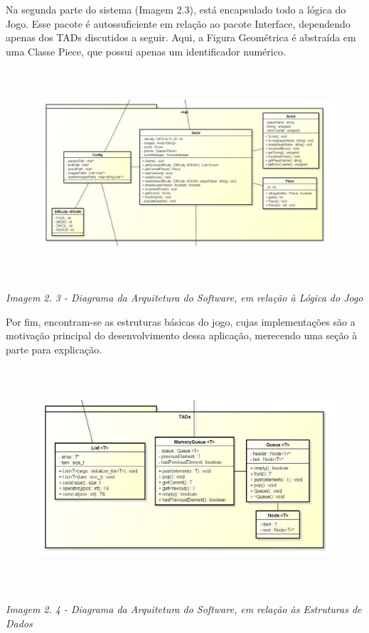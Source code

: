 \documentclass[a4paper]{article}
\newcounter{Imagem2}
\newcounter{Imagem1}
\begin{document}
\bigskip

Na segunda parte do sistema (Imagem 2.3), está encapsulado todo a lógica
do Jogo. Esse pacote é autossuficiente em relação ao pacote Interface,
dependendo apenas dos TADs discutidos a seguir. Aqui, a Figura
Geométrica é abstraída em uma Classe Piece, que possui apenas um
identificador numérico.

\begin{figure}
\centering
\includegraphics[width=6.2917in,height=3.0626in]{T1-img9.png}
\end{figure}

\bigskip

{\centering\itshape\color[rgb]{0.26666668,0.32941177,0.41568628}
Imagem 2. 3 - Diagrama da Arquitetura do Software, em relação à Lógica
do Jogo
\par}


\bigskip

Por fim, encontram-se as estruturas básicas do jogo, cujas
implementações são a motivação principal do desenvolvimento dessa
aplicação, merecendo uma seção à parte para explicação.



\begin{figure}
\centering
\includegraphics[width=6.302in,height=3.2602in]{T1-img10.png}
\end{figure}
{\centering\itshape\color[rgb]{0.26666668,0.32941177,0.41568628}
Imagem 2. 4 - Diagrama da Arquitetura do Software, em relação às
Estruturas de Dados
\par}
\end{document}

